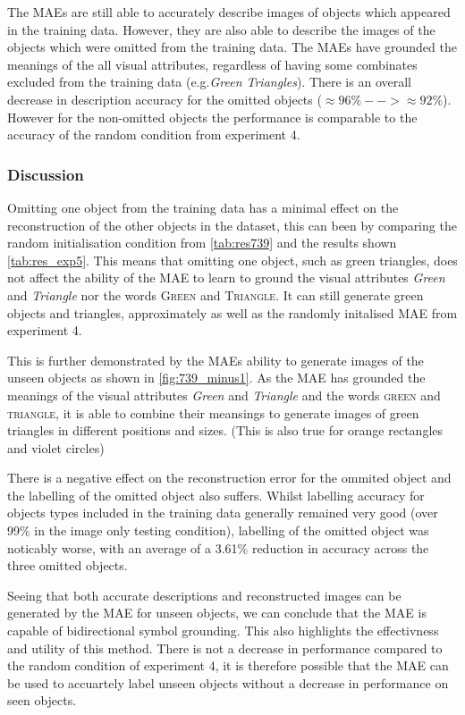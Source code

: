 The MAEs are still able to accurately describe images of objects which appeared in the training data. However, they are also able to describe the images of the objects which were omitted from the training data. The MAEs have grounded the meanings of the all visual attributes, regardless of having some combinates excluded from the training data (e.g.\textit{Green Triangles}). There is an overall decrease in description accuracy for the omitted objects ($\approx 96 \% --> \approx 92 \%$). However for the non-omitted objects the performance is comparable to the accuracy of the random condition from experiment 4.

\subsubsection{Discussion}
Omitting one object from the training data has a minimal effect on the reconstruction of the other objects in the dataset, this can been by comparing the random initialisation condition from \autoref{tab:res739} and the results shown \autoref{tab:res_exp5}. This means that omitting one object, such as green triangles, does not affect the ability of the MAE to learn to ground the visual attributes \textit{Green} and \textit{Triangle} nor the words \textsc{Green} and \textsc{Triangle}. It can still generate green objects and triangles, approximately as well as the randomly initalised MAE from experiment 4.

This is further demonstrated by the MAEs ability to generate images of the unseen objects as shown in \autoref{fig:739_minus1}. As the MAE has grounded the meanings of the visual attributes \textit{Green} and \textit{Triangle} and the words \textsc{green} and \textsc{triangle}, it is able to combine their meansings to generate images of green triangles in different positions and sizes. (This is also true for orange rectangles and violet circles)

There is a negative effect on the reconstruction error for the ommited object and the labelling of the omitted object also suffers. Whilst labelling accuracy for objects types included in the training data generally remained very good (over 99\% in the image only testing condition), labelling of the omitted object was noticably worse, with an average of a 3.61\% reduction in accuracy across the three omitted objects.

Seeing that both accurate descriptions and reconstructed images can be generated by the MAE for unseen objects, we can conclude that the MAE is capable of bidirectional symbol grounding. This also highlights the effectivness and utility of this method. There is not a decrease in performance compared to the random condition of experiment 4, it is therefore possible that the MAE can be used to accuartely label unseen objects without a decrease in performance on seen objects.



